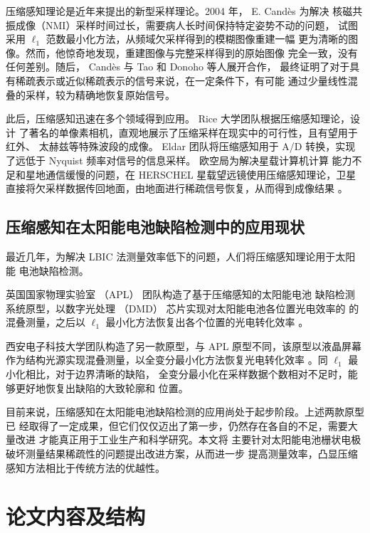 压缩感知理论是近年来提出的新型采样理论。2004 年， E. Cand\`es 为解决
核磁共振成像（NMI）采样时间过长，需要病人长时间保持特定姿势不动的问题，
试图采用 $\ell_1$ 范数最小化方法，从频域欠采样得到的模糊图像重建一幅
更为清晰的图像。然而，他惊奇地发现，重建图像与完整采样得到的原始图像
完全一致，没有任何差别。随后， Cand\`es 与 Tao 和 Donoho 等人展开合作，
最终证明了对于具有稀疏表示或近似稀疏表示的信号来说，在一定条件下，有可能
通过少量线性混叠的采样，较为精确地恢复原始信号\cite{CS2006}。

此后，压缩感知迅速在多个领域得到应用。 Rice 大学团队根据压缩感知理论，设计
了著名的单像素相机，直观地展示了压缩采样在现实中的可行性，且有望用于红外、
太赫兹等特殊波段的成像\cite{SinglePixel}。 Eldar 团队将压缩感知用于 A/D
转换，实现了远低于 Nyquist 频率对信号的信息采样\cite{CSAD}。 
欧空局为解决星载计算机计算
能力不足和星地通信缓慢的问题，在 HERSCHEL 星载望远镜使用压缩感知理论，卫星
直接将欠采样数据传回地面，由地面进行稀疏信号恢复，从而得到成像结果
\cite{HERSCHEL}。

\subsection{压缩感知在太阳能电池缺陷检测中的应用现状}

最近几年，为解决 LBIC 法测量效率低下的问题，人们将压缩感知理论用于太阳能
电池缺陷检测。

英国国家物理实验室 （APL） 团队构造了基于压缩感知的太阳能电池
缺陷检测系统原型，以数字光处理 （DMD） 芯片实现对太阳能电池各位置光电效率的
的混叠测量，之后以 $\ell_1$ 最小化方法恢复出各个位置的光电转化效率
\cite{CLBIC16} \cite{CLBIC17} 。

西安电子科技大学团队构造了另一款原型，与 APL 原型不同，该原型以液晶屏幕
作为结构光源实现混叠测量，以全变分最小化方法恢复光电转化效率
\cite{XDUCLBIC}。同 $\ell_1$ 最小化相比，对于边界清晰的缺陷，
全变分最小化在采样数据个数相对不足时，能够更好地恢复出缺陷的大致轮廓和
位置。

目前来说，压缩感知在太阳能电池缺陷检测的应用尚处于起步阶段。上述两款原型已
经取得了一定成果，但它们仅仅迈出了第一步，仍然存在各自的不足，需要大量改进
才能真正用于工业生产和科学研究。本文将
主要针对太阳能电池栅状电极破坏测量结果稀疏性的问题提出改进方案，从而进一步
提高测量效率，凸显压缩感知方法相比于传统方法的优越性。

\section{论文内容及结构}

